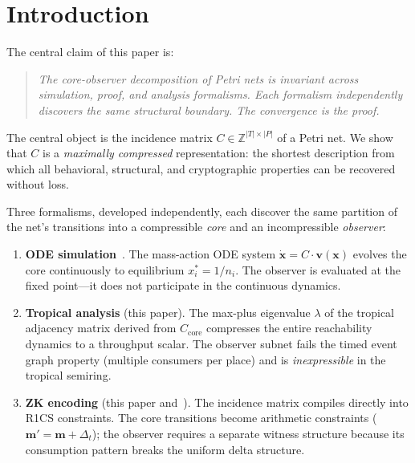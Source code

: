 \documentclass[11pt,a4paper]{article}
\newcommand{\Z}{\mathbb{Z}}
\begin{document}
\section{Introduction}
\label{sec:intro}

The central claim of this paper is:

\begin{quote}
\emph{The core-observer decomposition of Petri nets is invariant across simulation, proof, and analysis formalisms.
Each formalism independently discovers the same structural boundary.
The convergence is the proof.}
\end{quote}

The central object is the incidence matrix $C \in \Z^{|T| \times |P|}$ of a Petri net.
We show that $C$ is a \emph{maximally compressed} representation: the shortest description from which all behavioral, structural, and cryptographic properties can be recovered without loss.

Three formalisms, developed independently, each discover the same partition of the net's transitions into a compressible \emph{core} and an incompressible \emph{observer}:

\begin{enumerate}
  \item \textbf{ODE simulation}~\cite{york2025incidence}.  The mass-action ODE system $\dot{\mathbf{x}} = C \cdot \mathbf{v}(\mathbf{x})$ evolves the core continuously to equilibrium $x_i^* = 1/n_i$.  The observer is evaluated at the fixed point---it does not participate in the continuous dynamics.

  \item \textbf{Tropical analysis} (this paper).  The max-plus eigenvalue $\lambda$ of the tropical adjacency matrix derived from $C_{\mathrm{core}}$ compresses the entire reachability dynamics to a throughput scalar.  The observer subnet fails the timed event graph property (multiple consumers per place) and is \emph{inexpressible} in the tropical semiring.

  \item \textbf{ZK encoding} (this paper and~\cite{york2025incidence}).  The incidence matrix compiles directly into R1CS constraints.  The core transitions become arithmetic constraints ($\mathbf{m}' = \mathbf{m} + \Delta_t$); the observer requires a separate witness structure because its consumption pattern breaks the uniform delta structure.
\end{enumerate}
\end{document}
